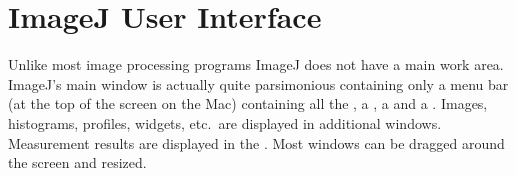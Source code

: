 
\part{ImageJ User Interface\label{par:User-Interface1}}

Unlike most image processing programs ImageJ does not have a main
work area. ImageJ's main
window is actually quite parsimonious containing only a menu bar (at
the top of the screen on the Mac) containing all the ,
a , a  and a .
Images, histograms, profiles, widgets, etc.\ are displayed in additional
windows. Measurement results are displayed in the .
Most windows can be dragged around the screen and resized. 

